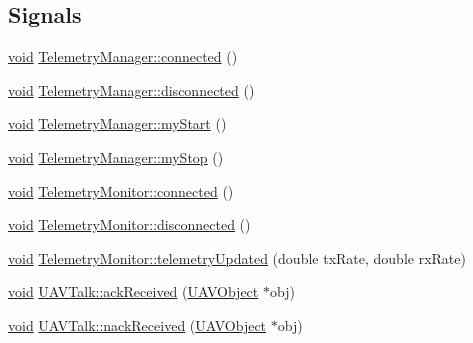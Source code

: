 \subsection*{\-Signals}
\begin{DoxyCompactItemize}
\item 
\hyperlink{group___u_a_v_objects_plugin_ga444cf2ff3f0ecbe028adce838d373f5c}{void} \hyperlink{group___u_a_v_talk_plugin_ga54bec8ecfe469710c7261f567e76c5f0}{\-Telemetry\-Manager\-::connected} ()
\item 
\hyperlink{group___u_a_v_objects_plugin_ga444cf2ff3f0ecbe028adce838d373f5c}{void} \hyperlink{group___u_a_v_talk_plugin_ga61e671949cc2403327617d9c9a372a76}{\-Telemetry\-Manager\-::disconnected} ()
\item 
\hyperlink{group___u_a_v_objects_plugin_ga444cf2ff3f0ecbe028adce838d373f5c}{void} \hyperlink{group___u_a_v_talk_plugin_gabb52305ac7bcf975fd60517b0dc9a148}{\-Telemetry\-Manager\-::my\-Start} ()
\item 
\hyperlink{group___u_a_v_objects_plugin_ga444cf2ff3f0ecbe028adce838d373f5c}{void} \hyperlink{group___u_a_v_talk_plugin_gabbe5997234dbee93471fcef62361d276}{\-Telemetry\-Manager\-::my\-Stop} ()
\item 
\hyperlink{group___u_a_v_objects_plugin_ga444cf2ff3f0ecbe028adce838d373f5c}{void} \hyperlink{group___u_a_v_talk_plugin_gac4e867b78642d4f1fe27c5fc97468ce7}{\-Telemetry\-Monitor\-::connected} ()
\item 
\hyperlink{group___u_a_v_objects_plugin_ga444cf2ff3f0ecbe028adce838d373f5c}{void} \hyperlink{group___u_a_v_talk_plugin_ga8445fbd983df4d054bb798c760ba0640}{\-Telemetry\-Monitor\-::disconnected} ()
\item 
\hyperlink{group___u_a_v_objects_plugin_ga444cf2ff3f0ecbe028adce838d373f5c}{void} \hyperlink{group___u_a_v_talk_plugin_gac7898d4b74305c568adefb289da72ebc}{\-Telemetry\-Monitor\-::telemetry\-Updated} (double tx\-Rate, double rx\-Rate)
\item 
\hyperlink{group___u_a_v_objects_plugin_ga444cf2ff3f0ecbe028adce838d373f5c}{void} \hyperlink{group___u_a_v_talk_plugin_ga2d657cf81a725bce5e859eb6828cf80c}{\-U\-A\-V\-Talk\-::ack\-Received} (\hyperlink{class_u_a_v_object}{\-U\-A\-V\-Object} $\ast$obj)
\item 
\hyperlink{group___u_a_v_objects_plugin_ga444cf2ff3f0ecbe028adce838d373f5c}{void} \hyperlink{group___u_a_v_talk_plugin_gac0268d5005ed3241192bae731c362f7e}{\-U\-A\-V\-Talk\-::nack\-Received} (\hyperlink{class_u_a_v_object}{\-U\-A\-V\-Object} $\ast$obj)
\end{DoxyCompactItemize}
